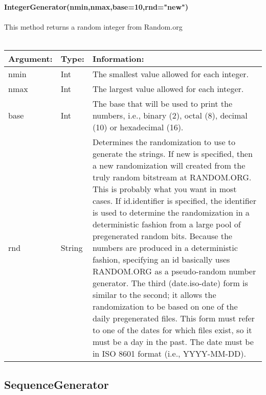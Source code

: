 \documentclass[12 pt]{report}
\begin{document}
\textbf{IntegerGenerator(nmin,nmax,base=10,rnd="new")}\\\\
This method returns a random integer from Random.org\\\\
\begin{tabular}{ | l | l | p{10cm} | }
    \hline
    \textbf{Argument:} & \textbf{Type:} & \textbf{Information:} \\ \hline
    nmin & Int &The smallest value allowed for each integer. \\ \hline
    nmax & Int &The largest value allowed for each integer.\\ \hline
    base & Int & The base that will be used to print the numbers, i.e., binary (2), octal (8), decimal (10) or hexadecimal (16). \\ \hline
    rnd & String & Determines the randomization to use to generate the strings. If new is specified, then a new randomization will created from the truly random bitstream at RANDOM.ORG. This is probably what you want in most cases. If id.identifier is specified, the identifier is used to determine the randomization in a deterministic fashion from a large pool of pregenerated random bits. Because the numbers are produced in a deterministic fashion, specifying an id basically uses RANDOM.ORG as a pseudo-random number generator. The third (date.iso-date) form is similar to the second; it allows the randomization to be based on one of the daily pregenerated files. This form must refer to one of the dates for which files exist, so it must be a day in the past. The date must be in ISO 8601  format (i.e., YYYY-MM-DD). \\
    \hline
  \end{tabular}

\subsection{SequenceGenerator}
\end{document}
